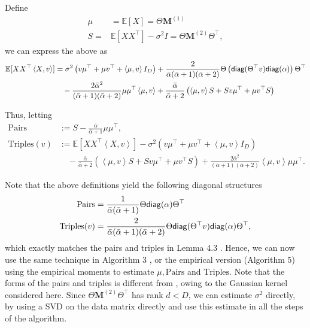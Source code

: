 \documentclass[bj,authoryear]{imsart}
\theoremstyle{plain}
\theoremstyle{remark}
\def\bM{\mathbf{M}}
\def\bbE{\mathbb{E}}
\def\diag{{\sf diag}}
\newcommand{\innerprod}[1]{\left\langle#1\right\rangle}
\begin{document}
\begin{appendix}
Define
\begin{align*}
    \mu &= \bbE[X]=\Theta \bM^{(1)} \\
    S =& \bbE[XX^\top]-\sigma^2 I = \Theta\bM^{(2)}\Theta^\top,
\end{align*} we can express the above as
\begin{align*}
\bbE[XX^\top\innerprod{X,v}] &= \sigma^2\left(v \mu^\top + \mu v^\top + \innerprod{\mu, v}  I_D\right) + \frac{2}{\bar{\alpha}(\bar{\alpha}+1)(\bar{\alpha}+2)}\Theta\left(\diag(\Theta^\top v)\diag(\alpha)\right)\Theta^\top \\
  & \quad - \frac{2\bar{\alpha}^2}{(\bar{\alpha}+1)(\bar{\alpha}+2)} \mu\mu^\top \innerprod{\mu,v} + \frac{\bar{\alpha}}{\bar{\alpha}+2} \left(\innerprod{\mu,v} S  + S v\mu^\top + \mu v^\top S\right)
 \end{align*}

Thus, letting
\begin{align}
    \text{Pairs} &:= S - \frac{\bar{\alpha}}{\bar{\alpha}+1} \mu\mu^\top, \label{eq:pairs}\\
    \text{Triples}(v) &:= \bbE[XX^\top\innerprod{X,v}] - \sigma^2\left(v \mu^\top + \mu v^\top + \innerprod{\mu, v}  I_D\right) \label{eq:triples} \\
    &\quad -\frac{\bar{\alpha}}{\bar{\alpha}+2}\left(\innerprod{\mu,v} S  + S v\mu^\top + \mu v^\top S\right) + \frac{2\bar{\alpha}^2}{(\bar{\alpha}+1)(\bar{\alpha}+2)} \innerprod{\mu,v} \mu\mu^\top. \nonumber
\end{align}

Note that the above definitions yield the following diagonal structures
\begin{align*}
    \text{Pairs} &= \frac{1}{\bar{\alpha}(\bar{\alpha}+1)}\Theta \diag(\alpha) \Theta^\top \\
    \text{Triples}(v) &= \frac{2}{\bar{\alpha}(\bar{\alpha}+1)(\bar{\alpha}+2)}\Theta \diag(\Theta^\top v)\diag(\alpha)\Theta^\top,
\end{align*}
which exactly matches the pairs and triples in Lemma 4.3 \cite{anandkumar2012spectral}. Hence, we can now use the same technique in Algorithm 3 \cite{anandkumar2012spectral}, or the empirical version (Algorithm 5) using the empirical moments to estimate $\mu, \text{Pairs}$ and $\text{Triples}$. Note that the forms of the pairs and triples is different from \cite{anandkumar2012spectral}, owing to the Gaussian kernel considered here. Since $\Theta\bM^{(2)}\Theta^\top$ has rank $d<D$, we can estimate $\sigma^2$ directly, by using a SVD on the data matrix directly and use this estimate in all the steps of the algorithm.


\end{appendix}
\end{document}
